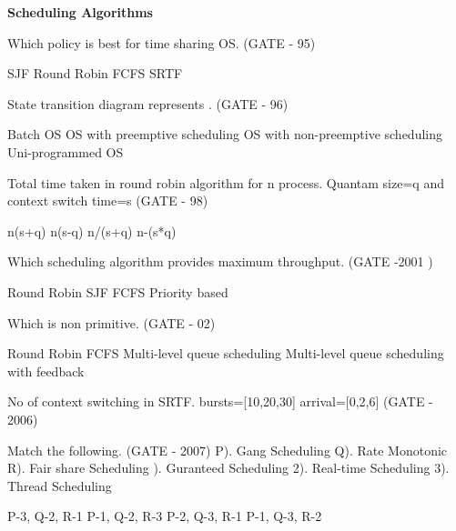 
\centerline{\textbf{ \LARGE Scheduling Algorithms}}


\setcounter{question}{0}

\question Which policy is best for time sharing OS. (GATE - 95)

\begin{oneparchoices}
   \choice SJF
   \choice Round Robin
   \choice FCFS
   \choice SRTF
\end{oneparchoices}

\question State transition diagram represents . (GATE - 96)
\begin{choices}
   \choice Batch OS
   \choice OS with preemptive scheduling
   \choice OS with non-preemptive scheduling
   \choice Uni-programmed OS
\end{choices}

\question Total time taken in round robin algorithm for n process. Quantam size=q and context switch time=s  (GATE - 98)

\begin{oneparchoices}
   \choice n(s+q)
   \choice n(s-q)
   \choice n/(s+q)
   \choice n-(s*q)
\end{oneparchoices}


  \question Which scheduling algorithm provides maximum throughput. (GATE -2001 )

  \begin{oneparchoices}
    \choice Round Robin
    \choice SJF
    \choice FCFS
    \choice Priority based
  \end{oneparchoices}

  \question Which is non primitive. (GATE - 02)

  \begin{choices}
    \choice Round Robin
    \choice FCFS
    \choice Multi-level queue scheduling
    \choice Multi-level queue scheduling with feedback
  \end{choices}

  \question No of context switching in SRTF. bursts=[10,20,30] arrival=[0,2,6] (GATE - 2006)

  \begin{oneparchoices}
  \end{oneparchoices}

  \question Match the following. (GATE - 2007) \newline
   P). Gang Scheduling  Q). Rate Monotonic  R). Fair share Scheduling ). Guranteed Scheduling 2). Real-time Scheduling 3). Thread Scheduling
  \begin{choices}
    \choice P-3, Q-2, R-1
    \choice P-1, Q-2, R-3
    \choice P-2, Q-3, R-1
    \choice P-1, Q-3, R-2
  \end{choices}

